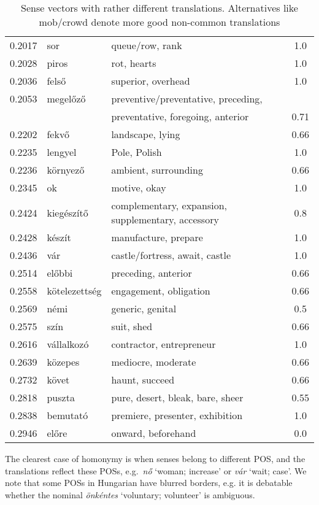 \documentclass[11pt]{article}
\begin{document}
\begin{table*}
\begin{tabular}{cllc}
  0.2017 & sor 	& queue/row, rank	&  1.0 \\
  0.2028 & piros 	& rot, hearts	&  1.0 \\
  0.2036 & felső 	& superior, overhead	&  1.0 \\
    0.2053 & megelőző 	& preventive/preventative, preceding,
    \\&&\hspace{1cm}preventative, foregoing, anterior	&  0.71 \\
  0.2202 & fekvő 	& landscape, lying	&  0.66 \\
  0.2235 & lengyel 	& Pole, Polish	&  1.0 \\
  0.2236 & környező 	& ambient, surrounding	& 0.66 \\
  0.2345 & ok 	& motive, okay	&  1.0 \\
  0.2424 & kiegészítő 	& complementary, expansion, supplementary, accessory	&  0.8 \\
  0.2428 & készít 	& manufacture, prepare	&  1.0 \\
  0.2436 & vár 	& castle/fortress, await, castle	&  1.0 \\
  0.2514 & előbbi 	& preceding, anterior	&  0.66 \\
  0.2558 & kötelezettség 	& engagement, obligation	& 0.66 \\
  0.2569 & némi 	& generic, genital	&  0.5 \\
  0.2575 & szín 	& suit, shed	&  0.66 \\
  0.2616 & vállalkozó 	& contractor, entrepreneur	&  1.0 \\
  0.2639 & közepes 	& mediocre, moderate	&  0.66 \\
  0.2732 & követ 	& haunt, succeed	&  0.66 \\
  0.2818 & puszta 	& pure, desert, bleak, bare, sheer	&  0.55 \\
  0.2838 & bemutató 	& premiere, presenter, exhibition	& 1.0 \\
  0.2946 & előre 	& onward, beforehand	&  0.0 \\
\end{tabular}
\caption{Sense vectors with rather different translations. Alternatives like
  mob/crowd denote more good non-common translations}
\label{tab:alkoto}
\end{table*}

The clearest case of homonymy is when senses belong to different POS, and the
translations reflect these POSs, e.g.~\emph{nő} `woman; increase' or \emph{vár}
 `wait; case'.  We note that some POSs in Hungarian have
blurred borders, e.g.  it is debatable whether the nominal \emph{önkéntes}
`voluntary; volunteer' is ambiguous. 
\end{document}
